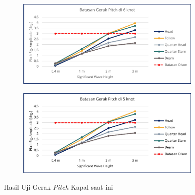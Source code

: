 \begin{figure}[!ht]
    \centering
    \begin{subfigure}{0.48\textwidth}
        \centering
        \includegraphics[width=\textwidth]{grafik/uji-pitch-spob.jpg}
    \end{subfigure}
    \hfill  %
    \begin{subfigure}{0.48\textwidth}
        \centering
        \includegraphics[width=\textwidth]{grafik/uji-pitch-spob2.jpg}
    \end{subfigure}
    \caption{Hasil Uji Gerak \emph{Pitch} Kapal saat ini}
    \label{fig:uji-pitch-spob}
\end{figure}

